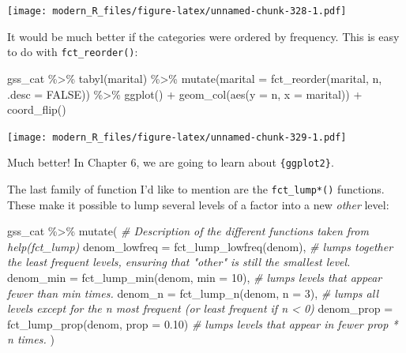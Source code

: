\documentclass[
]{article}
\newenvironment{Shaded}{\begin{snugshade}}{\end{snugshade}}
\newcommand{\AttributeTok}[1]{\textcolor[rgb]{0.77,0.63,0.00}{#1}}
\newcommand{\CommentTok}[1]{\textcolor[rgb]{0.56,0.35,0.01}{\textit{#1}}}
\newcommand{\ConstantTok}[1]{\textcolor[rgb]{0.00,0.00,0.00}{#1}}
\newcommand{\DecValTok}[1]{\textcolor[rgb]{0.00,0.00,0.81}{#1}}
\newcommand{\FloatTok}[1]{\textcolor[rgb]{0.00,0.00,0.81}{#1}}
\newcommand{\FunctionTok}[1]{\textcolor[rgb]{0.00,0.00,0.00}{#1}}
\newcommand{\NormalTok}[1]{#1}
\newcommand{\SpecialCharTok}[1]{\textcolor[rgb]{0.00,0.00,0.00}{#1}}
\begin{document}
\texttt{[image: modern\_R\_files/figure-latex/unnamed-chunk-328-1.pdf]}

It would be much better if the categories were ordered by frequency. This is easy to do with
\texttt{fct\_reorder()}:

\begin{Shaded}
\begin{Highlighting}[]
\NormalTok{gss\_cat }\SpecialCharTok{\%\textgreater{}\%}
    \FunctionTok{tabyl}\NormalTok{(marital) }\SpecialCharTok{\%\textgreater{}\%}
    \FunctionTok{mutate}\NormalTok{(}\AttributeTok{marital =} \FunctionTok{fct\_reorder}\NormalTok{(marital, n, }\AttributeTok{.desc =} \ConstantTok{FALSE}\NormalTok{)) }\SpecialCharTok{\%\textgreater{}\%}
    \FunctionTok{ggplot}\NormalTok{() }\SpecialCharTok{+}
    \FunctionTok{geom\_col}\NormalTok{(}\FunctionTok{aes}\NormalTok{(}\AttributeTok{y =}\NormalTok{ n, }\AttributeTok{x =}\NormalTok{ marital)) }\SpecialCharTok{+}
    \FunctionTok{coord\_flip}\NormalTok{()}
\end{Highlighting}
\end{Shaded}

\texttt{[image: modern\_R\_files/figure-latex/unnamed-chunk-329-1.pdf]}

Much better! In Chapter 6, we are going to learn about \texttt{\{ggplot2\}}.

The last family of function I'd like to mention are the \texttt{fct\_lump*()} functions. These make it possible
to lump several levels of a factor into a new \emph{other} level:

\begin{Shaded}
\begin{Highlighting}[]
\NormalTok{gss\_cat }\SpecialCharTok{\%\textgreater{}\%}
  \FunctionTok{mutate}\NormalTok{(}
    \CommentTok{\# Description of the different functions taken from help(fct\_lump)}
    \AttributeTok{denom\_lowfreq =} \FunctionTok{fct\_lump\_lowfreq}\NormalTok{(denom), }\CommentTok{\# lumps together the least frequent levels, ensuring that "other" is still the smallest level.}
    \AttributeTok{denom\_min =} \FunctionTok{fct\_lump\_min}\NormalTok{(denom, }\AttributeTok{min =} \DecValTok{10}\NormalTok{), }\CommentTok{\# lumps levels that appear fewer than min times.}
    \AttributeTok{denom\_n =} \FunctionTok{fct\_lump\_n}\NormalTok{(denom, }\AttributeTok{n =} \DecValTok{3}\NormalTok{), }\CommentTok{\# lumps all levels except for the n most frequent (or least frequent if n \textless{} 0)}
    \AttributeTok{denom\_prop =} \FunctionTok{fct\_lump\_prop}\NormalTok{(denom, }\AttributeTok{prop =} \FloatTok{0.10}\NormalTok{) }\CommentTok{\# lumps levels that appear in fewer prop * n times.}
\NormalTok{         )}
\end{Highlighting}
\end{Shaded}
\end{document}
